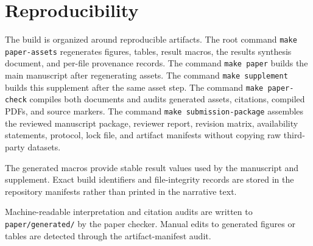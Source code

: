 \section{Reproducibility}
\label{supp:reproducibility}

The build is organized around reproducible artifacts. The root command \texttt{make paper-assets} regenerates figures, tables, result macros, the results synthesis document, and per-file provenance records. The command \texttt{make paper} builds the main manuscript after regenerating assets. The command \texttt{make supplement} builds this supplement after the same asset step. The command \texttt{make paper-check} compiles both documents and audits generated assets, citations, compiled PDFs, and source markers. The command \texttt{make submission-package} assembles the reviewed manuscript package, reviewer report, revision matrix, availability statements, protocol, lock file, and artifact manifests without copying raw third-party datasets.

The generated macros provide stable result values used by the manuscript and supplement. Exact build identifiers and file-integrity records are stored in the repository manifests rather than printed in the narrative text.

Machine-readable interpretation and citation audits are written to \texttt{paper/generated/} by the paper checker. Manual edits to generated figures or tables are detected through the artifact-manifest audit.

